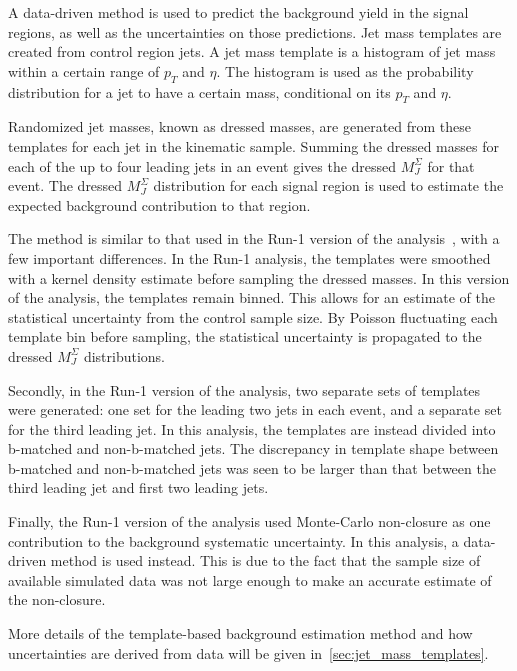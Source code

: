 A data-driven method is used to predict the background yield in the signal regions, as well as the uncertainties on those predictions.
Jet mass templates are created from control region jets.
A jet mass template is a histogram of jet mass within a certain range of $p_{T}$ and $\eta$.
The histogram is used as the probability distribution for a jet to have a certain mass, conditional on its $p_{T}$ and $\eta$.

Randomized jet masses, known as dressed masses, are generated from these templates for each jet in the kinematic sample.
Summing the dressed masses for each of the up to four leading jets in an event gives the dressed $M_{J}^{\Sigma}$ for that event.
The dressed $M_{J}^{\Sigma}$ distribution for each signal region is used to estimate the expected background contribution to that region.

The method is similar to that used in the Run-1 version of the analysis~\cite{run1-multijet}, with a few important differences.
In the Run-1 analysis, the templates were smoothed with a kernel density estimate before sampling the dressed masses.
In this version of the analysis, the templates remain binned.
This allows for an estimate of the statistical uncertainty from the control sample size.
By Poisson fluctuating each template bin before sampling, the statistical uncertainty is propagated to the dressed $M_J^{\Sigma}$ distributions.

Secondly, in the Run-1 version of the analysis, two separate sets of templates were generated: one set for the leading two jets in each event, and a separate set for the third leading jet.
In this analysis, the templates are instead divided into b-matched and non-b-matched jets.
The discrepancy in template shape between b-matched and non-b-matched jets was seen to be larger than that between the third leading jet and first two leading jets.

Finally, the Run-1 version of the analysis used Monte-Carlo non-closure as one contribution to the background systematic uncertainty.
In this analysis, a data-driven method is used instead.
This is due to the fact that the sample size of available simulated data was not large enough to make an accurate estimate of the non-closure.

More details of the template-based background estimation method and how uncertainties are derived from data will be given in~\ref{sec:jet_mass_templates}.